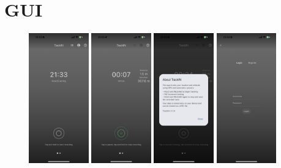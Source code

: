 \documentclass[12pt]{article}
\begin{document}
\section{GUI}
\begin{figure}[h!]
    \centering
    \includegraphics[width=0.23\textwidth]{Project_Screenshots/iOS-1.jpeg}
    \includegraphics[width=0.23\textwidth]{Project_Screenshots/iOS-2.jpeg}
    \includegraphics[width=0.23\textwidth]{Project_Screenshots/iOS-3.jpeg}
    \includegraphics[width=0.23\textwidth]{Project_Screenshots/iOS-4.jpeg}


\end{figure}
\end{document}
